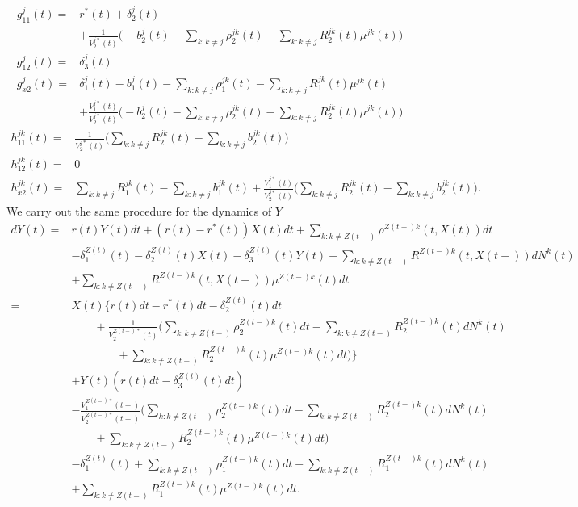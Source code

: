 \documentclass[12pt]{article}
\theoremstyle{my_thm}
\begin{document}
\begin{align*}
g^j_{11}(t)=&r^*(t)  +\delta_2^j(t)\\
&+\frac{1}{V_2^{j*}(t)}\bigg(
-b^j_2(t)-\sum_{k:k\neq j}\rho_2^{jk}(t)-\sum_{k:k\neq j}R_2^{jk}(t)\mu^{jk}(t)
\bigg)
\\
g^j_{12}(t)=&\delta_3^j(t)
\\
g^j_{x2}(t)=& \delta_1^{j}(t) 
-b_1^{j}(t)
-\sum_{k:k\neq j} \rho^{jk}_1(t) -\sum_{k:k\neq j} R^{jk}_1(t) \mu^{jk}(t)
\\
&+
\frac{V^{j*}_1(t)}{V^{j*}_2(t)}
\bigg( -b_2^{j}(t)-\sum_{k:k\neq j} \rho^{jk}_2(t) -\sum_{k:k\neq j} R^{jk}_2(t) \mu^{jk}(t) \bigg)
\end{align*}
\begin{align*}
h^{jk}_{11}(t)=& \frac{1}{V_2^{j*}(t)} \bigg( 
\sum_{k:k\neq j}R_2^{jk}(t)-\sum_{k:k\neq j}b_2^{jk}(t)
\bigg)
\\
h^{jk}_{12}(t)=& 0 
\\
h^{jk}_{x2}(t)=& 
\sum_{k:k\neq j} R^{jk}_1(t) -\sum_{k:k\neq j}b_1^{jk}(t)
+
\frac{V^{j*}_1(t)}{V^{j*}_2(t)}
\bigg( \sum_{k:k\neq j} R^{jk}_2(t)-\sum_{k:k\neq j}b_2^{jk}(t)  \bigg).
\end{align*}
We carry out the same procedure for the dynamics of $Y$
\begin{align*}
dY(t)=&
r(t) Y(t) dt +(r(t)-r^*(t))X(t)dt+\sum_{k:k\neq Z(t-)} \rho^{Z(t-)k}(t,X(t)) dt
\\
&-\delta_1^{Z(t)}(t)-\delta_2^{Z(t)}(t)X(t)-\delta_3^{Z(t)}(t)Y(t)-
\sum_{k:k \neq Z(t-)}  R^{Z(t-)k}(t,X(t-)) dN^k(t)
\\
&+
\sum_{k:k \neq Z(t-)}  R^{Z(t-)k}(t,X(t-)) \mu^{Z(t-)k}(t) dt
\\
=&
X(t) \bigg\lbrace 
r(t)dt-r^*(t)dt -\delta_2^{Z(t)}(t)dt
\\
& \qquad + \frac{1}{V_2^{Z(t-)*}(t)} \bigg( 
\sum_{k:k\neq Z(t-)} \rho_2^{Z(t-)k}(t) dt
-\sum_{k:k \neq Z(t-)}  R^{Z(t-)k}_2(t) dN^k(t)
\\
&
\qquad \qquad +\sum_{k:k \neq Z(t-)}  R^{Z(t-)k}_2(t) \mu^{Z(t-)k}(t) dt
\bigg)
\bigg\rbrace
\\
&+ Y(t)( 
r(t) dt-\delta_3^{Z(t)}(t) dt)
\\
&- \frac{V_1^{Z(t-)*}(t-)}{V_2^{Z(t-)*}(t-)}\bigg(
\sum_{k:k\neq Z(t-)} \rho^{Z(t-)k}_2(t) dt
-\sum_{k:k\neq Z(t-)} R^{Z(t-)k}_2(t) dN^k(t)
\\
&\qquad  +\sum_{k:k\neq Z(t-)} R^{Z(t-)k}_2(t) \mu^{Z(t-)k}(t) dt
\bigg)
\\
&-\delta_1^{Z(t)}(t)
+
\sum_{k:k\neq Z(t-)} \rho^{Z(t-)k}_1(t) dt
-
\sum_{k:k \neq Z(t-)}  R_1^{Z(t-)k}(t) dN^k(t)
\\&
+\sum_{k:k \neq Z(t-)}  R_1^{Z(t-)k}(t) \mu^{Z(t-)k}(t) dt.
\end{align*}
\end{document}
